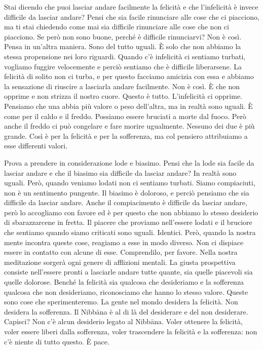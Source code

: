 Stai dicendo che puoi lasciar andare facilmente la felicità e che
l'infelicità è invece difficile da lasciar andare? Pensi che sia facile
rinunciare alle cose che ci piacciono, ma ti stai chiedendo come mai sia
difficile rinunciare alle cose che non ci piacciono. Se però non sono
buone, perché è difficile rinunciarvi? Non è così. Pensa in un'altra
maniera. Sono del tutto uguali. È solo che non abbiamo la stessa
propensione nei loro riguardi. Quando c'è infelicità ci sentiamo
turbati, vogliamo fuggire velocemente e perciò sentiamo che è difficile
liberarsene. La felicità di solito non ci turba, e per questo facciamo
amicizia con essa e abbiamo la sensazione di riuscire a lasciarla andare
facilmente. Non è così. È che non opprime e non strizza il nostro cuore.
Questo è tutto. L'infelicità ci opprime. Pensiamo che una abbia più
valore o peso dell'altra, ma in realtà sono uguali. È come per il caldo
e il freddo. Possiamo essere bruciati a morte dal fuoco. Però anche il
freddo ci può congelare e fare morire ugualmente. Nessuno dei due è più
grande. Così è per la felicità e per la sofferenza, ma col pensiero
attribuiamo a esse differenti valori.

Prova a prendere in considerazione lode e biasimo. Pensi che la lode sia
facile da lasciar andare e che il biasimo sia difficile da lasciar
andare? In realtà sono uguali. Però, quando veniamo lodati non ci
sentiamo turbati. Siamo compiaciuti, non è un sentimento pungente. Il
biasimo è doloroso, e perciò pensiamo che sia difficile da lasciar
andare. Anche il compiacimento è difficile da lasciar andare, però lo
accogliamo con favore ed è per questo che non abbiamo lo stesso
desiderio di sbarazzarcene in fretta. Il piacere che proviamo
nell'essere lodati e il bruciore che sentiamo quando siamo criticati
sono uguali. Identici. Però, quando la nostra mente incontra queste
cose, reagiamo a esse in modo diverso. Non ci dispiace essere in
contatto con alcune di esse. Comprendilo, per favore. Nella nostra
meditazione sorgerà ogni genere di afflizioni mentali. La giusta
prospettiva consiste nell'essere pronti a lasciarle andare tutte quante,
sia quelle piacevoli sia quelle dolorose. Benché la felicità sia
qualcosa che desideriamo e la sofferenza qualcosa che non desideriamo,
riconosciamo che hanno lo stesso valore. Queste sono cose che
sperimenteremo. La gente nel mondo desidera la felicità. Non desidera la
sofferenza. Il Nibbāna è al di là del desiderare e del non
desiderare. Capisci? Non c'è alcun desiderio legato al Nibbāna.
Voler ottenere la felicità, voler essere liberi dalla sofferenza, voler
trascendere la felicità e la sofferenza: non c'è niente di tutto questo.
È pace.

